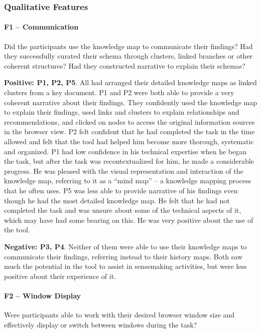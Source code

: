 \subsubsection{Qualitative Features}

\paragraph{F1 -- Communication}
Did the participants use the knowledge map to communicate their findings? Had they successfully curated their schema through clusters, linked branches or other coherent structures? Had they constructed narrative to explain their schemas?

\textbf{Positive: P1, P2, P5}. All had arranged their detailed knowledge maps as linked clusters from a key document. P1 and P2 were both able to provide a very coherent narrative about their findings. They confidently used the knowledge map to explain their findings, used links and clusters to explain relationships and recommendations, and clicked on nodes to access the original information sources in the browser view. P2 felt confident that he had completed the task in the time allowed and felt that the tool had helped him become more thorough, systematic and organized. P1 had low confidence in his technical expertise when he began the task, but after the task was recontextualized for him, he made a considerable progress. He was pleased with the visual representation and interaction of the knowledge map, referring to it as a ``mind map'' -- a knowledge mapping process that he often uses. P5 was less able to provide narrative of his findings even though he had the most detailed knowledge map. He felt that he had not completed the task and was unsure about some of the technical aspects of it, which may have had some bearing on this. He was very positive about the use of the tool.

\textbf{Negative: P3, P4}. Neither of them were able to use their knowledge maps to communicate their findings, referring instead to their history maps. Both saw much the potential in the tool to assist in sensemaking activities, but were less positive about their experience of it.

\paragraph{F2 -- Window Display}
Were participants able to work with their desired browser window size and effectively display or switch between windows during the task?

